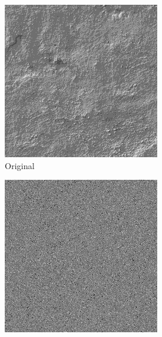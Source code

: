 \documentclass[11pt, oneside]{article}   	%
\begin{document}
\begin{figure}[H]
    \centering
    \begin{subfigure}[b]{0.3\textwidth}
        \includegraphics[width=\textwidth]{stucco0}
        \caption{Original}
        \label{fig:stucco0}
    \end{subfigure}
    \begin{subfigure}[b]{0.3\textwidth}
        \includegraphics[width=\textwidth]{stucco1}

\end{subfigure}
\end{figure}
\end{document}
